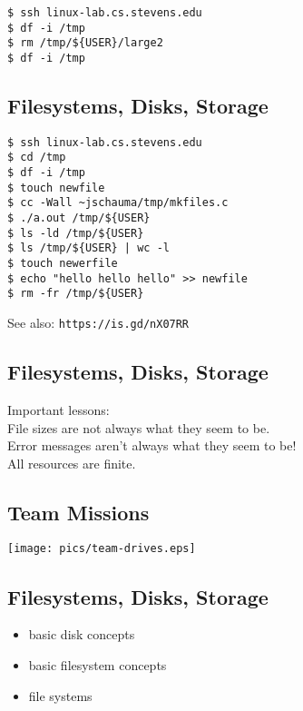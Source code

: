 \documentclass[xga]{xdvislides}
\begin{document}
\begin{verbatim}
$ ssh linux-lab.cs.stevens.edu
$ df -i /tmp
$ rm /tmp/${USER}/large2
$ df -i /tmp
\end{verbatim}

\subsection{Filesystems, Disks, Storage}

\begin{verbatim}
$ ssh linux-lab.cs.stevens.edu
$ cd /tmp
$ df -i /tmp
$ touch newfile
$ cc -Wall ~jschauma/tmp/mkfiles.c
$ ./a.out /tmp/${USER}
$ ls -ld /tmp/${USER}
$ ls /tmp/${USER} | wc -l
$ touch newerfile
$ echo "hello hello hello" >> newfile
$ rm -fr /tmp/${USER}
\end{verbatim}

See also:
\verb+https://is.gd/nX07RR+

\subsection{Filesystems, Disks, Storage}
Important lessons: \\

File sizes are not always what they seem to be. \\

Error messages aren't always what they seem to be! \\

All resources are finite.

\subsection{Team Missions}
\vfill
\begin{center}
	\texttt{[image: pics/team-drives.eps]} \\
\end{center}
\vfill


\subsection{Filesystems, Disks, Storage}
\begin{itemize}
	\item basic disk concepts
	\item basic filesystem concepts
	\item file systems
\end{itemize}
\end{document}
